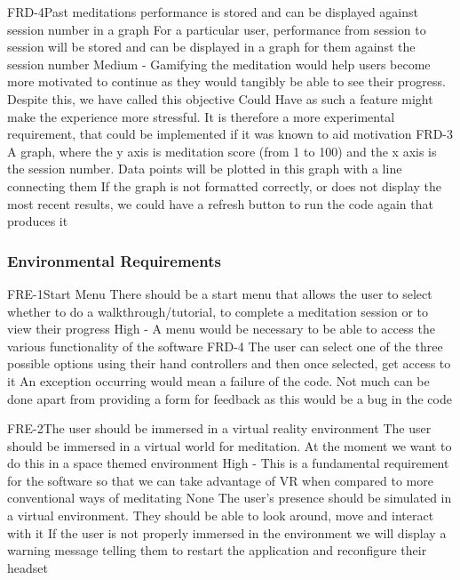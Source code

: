 \documentclass[coverpage,lineno]{../custom}
\begin{document}
\FunctionalReq
{FRD-4}{Past meditations performance is stored and can be displayed against session number in a graph}
{For a particular user, performance from session to session will be stored and can be displayed in a graph for them against the session number}
{Medium - \couldhave}
{Gamifying the meditation would help users become more motivated to continue as they would  tangibly be able to see their progress. Despite this, we have called this objective Could Have as such a feature might make the experience more stressful. It is therefore a more experimental requirement, that could be implemented if it was known to aid motivation}
{FRD-3}
{A graph, where the y axis is meditation score (from 1 to 100) and the x axis is the session number. Data points will be plotted in this graph with a line connecting them}
{If the graph is not formatted correctly, or does not display the most recent results, we could have a refresh button to run the code again that produces it}

\subsubsection{Environmental Requirements}

\FunctionalReq
{FRE-1}{Start Menu}
{There should be a start menu that allows the user to select whether to do a walkthrough/tutorial, to complete a meditation session or to view their progress}
{High - \musthave}
{A menu would be necessary to be able to access the various functionality of the software}
{FRD-4}
{The user can select one of the three possible options using their hand controllers and then once selected, get access to it}
{An exception occurring would mean a failure of the code. Not much can be done apart from providing a form for feedback as this would be a bug in the code}

\FunctionalReq
{FRE-2}{The user should be immersed in a virtual reality environment}
{The user should be immersed in a virtual world for meditation. At the moment we want to do this in a space themed environment}
{High - \musthave}
{This is a fundamental requirement for the software so that we can take advantage of VR when compared to more conventional ways of meditating}
{None}
{The user's presence should be simulated in a virtual environment. They should be able to look around, move and interact with it}
{If the user is not properly immersed in the environment we will display a warning message telling them to restart the application and reconfigure their headset}
\end{document}
